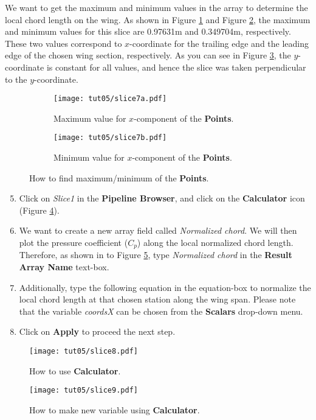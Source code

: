We want to get the maximum and minimum values in the array to determine the local chord length on the wing. As shown in Figure \ref{fig5:slice7 a} and Figure \ref{fig5:slice7 b}, the maximum and minimum values for this slice are 0.97631m and 0.349704m, respectively. These two values correspond to $x$-coordinate for the trailing edge and the leading edge of the chosen wing section, respectively. As you can see in Figure \ref{fig5:slice7}, the $y$-coordinate is constant for all values, and hence the slice was taken perpendicular to the $y$-coordinate.
\begin{figure}[ht]
    \centering
     \begin{subfigure}[b]{.75\textwidth}
         \centering
         \texttt{[image: tut05/slice7a.pdf]}
         \caption{Maximum value for $x$-component of the \textbf{Points}.}
         \label{fig5:slice7 a}
     \end{subfigure}
     \hfill
     \begin{subfigure}[b]{.75\textwidth}
         \centering
         \texttt{[image: tut05/slice7b.pdf]}
         \caption{Minimum value for $x$-component of the \textbf{Points}.}
         \label{fig5:slice7 b}
     \end{subfigure}     
    \caption{How to find maximum/minimum of the \textbf{Points}.}
    \label{fig5:slice7}
\end{figure}
\begin{enumerate}[label=\arabic*)]
	\setcounter{enumi}{4}
	\item Click on \textit{Slice1} in the \textbf{Pipeline Browser}, and click on the \textbf{Calculator} icon (Figure \ref{fig5:slice8}).
	\item We want to create a new array field called \textit{Normalized chord}. We will then plot the pressure coefficient ($C_p$) along the local normalized chord length. Therefore, as shown in to Figure \ref{fig5:slice9}, type \textit{Normalized chord} in the \textbf{Result Array Name} text-box.
	\item  Additionally, type the following equation in the equation-box to normalize the local chord length at that chosen station along the wing span. Please note that the variable \textit{coordsX} can be chosen from the \textbf{Scalars} drop-down menu.
	\item Click on \textbf{Apply} to proceed the next step.
\end{enumerate}
\begin{figure}[ht]
    \centering
    \texttt{[image: tut05/slice8.pdf]}
    \caption{How to use \textbf{Calculator}.}
    \label{fig5:slice8}
\end{figure}
\begin{figure}[H]
    \centering
    \texttt{[image: tut05/slice9.pdf]}
    \caption{How to make new variable using \textbf{Calculator}.}
    \label{fig5:slice9}
\end{figure}

